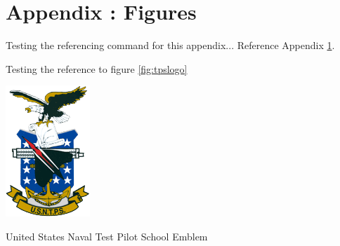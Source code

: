 \chapter{Appendix \thechapter: Figures}\label{app:Figures}

\renewcommand\numberline[1]{\hbox to 62pt{Figure #1:\hspace{1ex}}} %

\vspace*{-2.5cm}
\listofafigures

\pagebreak

Testing the referencing command for this appendix... Reference Appendix \ref{app:Figures}.

Testing the reference to figure \ref{fig:tpslogo}

\begin{afigure}[htb]
    \centering
    \includegraphics[width=0.4\columnwidth]{figures/usntps.png}
    \caption{United States Naval Test Pilot School Emblem}
    \label{fig:tpslogo}
\end{afigure}

\pagebreak


% 
